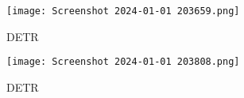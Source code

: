 \documentclass{article}
\begin{document}
\begin{figure}[H]
  \centering
  \texttt{[image: Screenshot 2024-01-01 203659.png]} %
  \caption{DETR}
  \label{fig:example}
\end{figure}

\begin{figure}[H]
  \centering
  \texttt{[image: Screenshot 2024-01-01 203808.png]} %
  \caption{DETR}
  \label{fig:example}
\end{figure}







\end{document}
